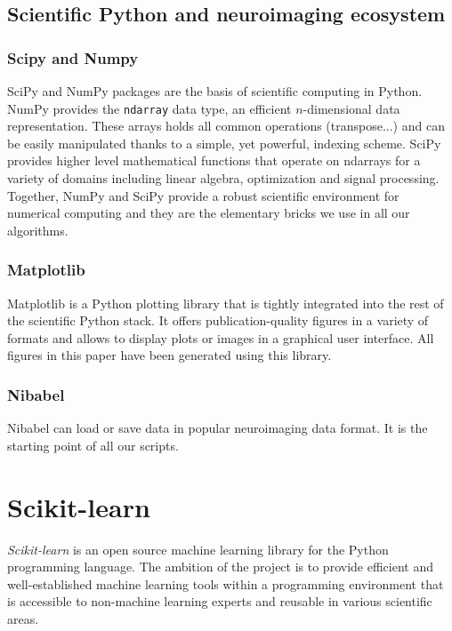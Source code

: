 \documentclass{frontiersSCNS} %
\newcounter{x}
\newcounter{y}
\newcounter{z}
\begin{document}
\subsection{Scientific Python and neuroimaging ecosystem}

\subsubsection{Scipy and Numpy}

SciPy and NumPy packages are the basis of scientific computing in Python.
NumPy provides the \verb!ndarray! data type, an efficient $n$-dimensional data
representation. These arrays holds all common operations (transpose...) and
can be easily manipulated thanks to a simple, yet powerful, indexing scheme.
SciPy provides higher level mathematical functions that operate on ndarrays for
a variety of domains including linear algebra, optimization and signal
processing. Together, NumPy and SciPy provide a robust scientific environment
for numerical computing and they are the elementary bricks we use in all our
algorithms.

\subsubsection{Matplotlib}

Matplotlib is a Python plotting library that is tightly integrated into the
rest of the scientific Python stack. It offers publication-quality figures in
a variety of formats and allows to display plots or images in a
graphical user interface. All figures in this paper have been generated using
this library.


\subsubsection{Nibabel}

Nibabel can load or save data in
popular neuroimaging data format. It is the starting point of all
our scripts.

\section{Scikit-learn}
\label{scikitlearn}

{\em Scikit-learn} \citep{pedregosa2011} is an open source machine
learning library for the Python programming language. The ambition of the
project is to provide efficient and well-established machine learning tools within
a programming environment that is accessible to non-machine learning experts
and reusable in various scientific areas.
\end{document}
